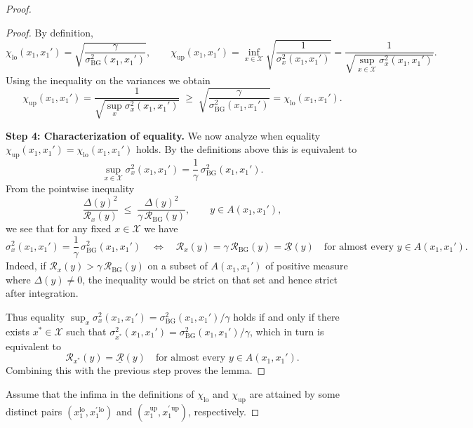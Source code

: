 \documentclass{article}
\theoremstyle{plain}
\theoremstyle{definition}
\begin{document}
\begin{proof}
\begin{proof}
By definition,
\[
  \chi_{\mathrm{lo}}(x_1,x_1')
  = \sqrt{\frac{\gamma}{\sigma_{\mathrm{BG}}^2(x_1,x_1')}},
  \qquad
  \chi_{\mathrm{up}}(x_1,x_1')
  = \inf_{x\in\mathcal X}
      \sqrt{\frac{1}{\sigma_x^2(x_1,x_1')}}
  = \frac{1}{\sqrt{\sup_{x\in\mathcal X} \sigma_x^2(x_1,x_1')}}.
\]
Using the inequality on the variances we obtain
\[
  \chi_{\mathrm{up}}(x_1,x_1')
  = \frac{1}{\sqrt{\sup_x \sigma_x^2(x_1,x_1')}}
  \;\ge\;
  \sqrt{\frac{\gamma}{\sigma_{\mathrm{BG}}^2(x_1,x_1')}}
  = \chi_{\mathrm{lo}}(x_1,x_1').
\]

\textbf{Step 4: Characterization of equality.}
We now analyze when equality
$\chi_{\mathrm{up}}(x_1,x_1')=\chi_{\mathrm{lo}}(x_1,x_1')$ holds.
By the definitions above this is equivalent to
\[
  \sup_{x\in\mathcal X} \sigma_x^2(x_1,x_1')
  = \frac{1}{\gamma}\,\sigma_{\mathrm{BG}}^2(x_1,x_1').
\]
From the pointwise inequality
\[
  \frac{\Delta(y)^2}{\mathcal R_x(y)}
  \;\le\;
  \frac{\Delta(y)^2}{\gamma\,\mathcal R_{\mathrm{BG}}(y)},
  \qquad y\in A(x_1,x_1'),
\]
we see that for any fixed $x\in\mathcal X$ we have
\[
  \sigma_x^2(x_1,x_1')
  = \frac{1}{\gamma}\,\sigma_{\mathrm{BG}}^2(x_1,x_1')
  \quad\Longleftrightarrow\quad
  \mathcal R_x(y)
  = \gamma\,\mathcal R_{\mathrm{BG}}(y)
  = \underline{\mathcal R}(y)
  \quad\text{for almost every }y\in A(x_1,x_1').
\]
Indeed, if $\mathcal R_x(y)>\gamma\,\mathcal R_{\mathrm{BG}}(y)$ on a
subset of $A(x_1,x_1')$ of positive measure where $\Delta(y)\neq0$, the
inequality would be strict on that set and hence strict after integration.

Thus equality
$\sup_x \sigma_x^2(x_1,x_1') = \sigma_{\mathrm{BG}}^2(x_1,x_1')/\gamma$
holds if and only if there exists $x^\ast\in\mathcal X$ such that
$\sigma_{x^\ast}^2(x_1,x_1') = \sigma_{\mathrm{BG}}^2(x_1,x_1')/\gamma$,
which in turn is equivalent to
\[
  \mathcal R_{x^\ast}(y)
  = \underline{\mathcal R}(y)
  \quad\text{for almost every }y\in A(x_1,x_1').
\]
Combining this with the previous step proves the lemma.
\end{proof}


Assume that the infima in the definitions of
$\chi_{\mathrm{lo}}$ and $\chi_{\mathrm{up}}$ are
attained by some distinct pairs
$(x_1^{\mathrm{lo}},x_1^{\prime\,\mathrm{lo}})$ and
$(x_1^{\mathrm{up}},x_1^{\prime\,\mathrm{up}})$, respectively.


\end{proof}
\end{document}

